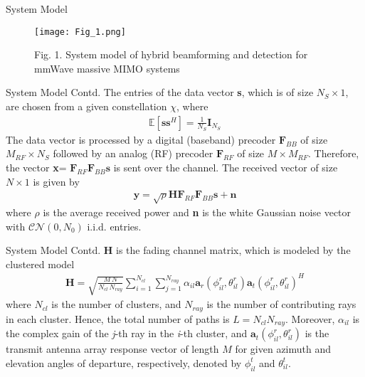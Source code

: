 \documentclass{beamer}
\providecommand{\brak}[1]{\ensuremath{\left(#1\right)}}
\begin{document}
\begin{frame}{System Model}
    \begin{figure}[htp]
    \centering
    \texttt{[image: Fig\_1.png]}
    \caption{Fig. 1. System model of hybrid beamforming and detection for mmWave
massive MIMO systems}
    \label{Fig. 1.}
\end{figure}
\end{frame}

\begin{frame}{System Model Contd.} 
The entries of the data vector \textbf{s}, which is of size $N_S \times 1$, are chosen from a given constellation $\chi$, where 
\begin{align}
    \mathbb{E} [\boldsymbol{ss}^H] = \frac{1}{N_S} \boldsymbol{I}_{N_S}
\end{align}
The data vector is processed by a digital (baseband) precoder $\boldsymbol{F}_{BB}$ of size $M_{RF} \times N_S$ followed by an analog (RF) precoder $\boldsymbol{F}_{RF}$ of size $M \times M_{RF}$. Therefore, the vector \textbf{x}= $\boldsymbol{F}_{RF} \boldsymbol{F}_{BB} \boldsymbol{s}$ is sent over the channel.
The received vector of size $N\times 1$ is given by
\begin{align}
    \boldsymbol{y} = \sqrt{\rho}\boldsymbol{HF}_{RF}\boldsymbol{F}_{BB}\boldsymbol{s}+\boldsymbol{n}
\end{align}
where $\rho$ is the average received power and \textbf{n} is the white Gaussian noise vector with $\mathcal{CN}\brak{0,N_0}$ i.i.d. entries.
\end{frame}

\begin{frame}{System Model Contd.}
 \textbf{H} is
the fading channel matrix, which is modeled by the clustered model
\begin{align}
    \boldsymbol{H} = \sqrt{\frac{M\,N}{N_{cl}\,N_{ray}}} \sum_{i=1}^{N_{cl}} {\sum_{j=1}^{N_{ray}} {\alpha_{il} \boldsymbol{a}_r\brak{\phi_{il}^r,\theta_{il}^r} \boldsymbol{a}_t\brak{\phi_{il}^r,\theta_{il}^r}^H}}
\end{align}
where $N_{cl}$ is the number of clusters, and $N_{ray}$ is the number of contributing rays in each cluster. Hence, the total number
of paths is $L = N_{cl}N_{ray} $. Moreover, $\alpha_{il}$ is the complex gain of the \textit{j}-th ray in the \textit{i}-th cluster, and $\boldsymbol{a}_t\brak{\phi_{il}^r,\theta_{il}^r}$ is the transmit antenna array response vector of length $M$ for given azimuth and elevation angles of departure, respectively, denoted by
$\phi_{il}^t$ and $\theta_{il}^t$.
\end{frame}
\end{document}
